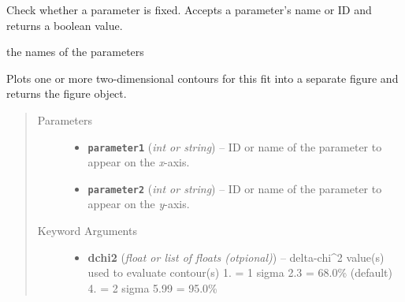 \documentclass[a4paper,10pt,english]{sphinxmanual}
\begin{document}
\begin{fulllineitems}
\begin{fulllineitems}
\end{fulllineitems}


\begin{fulllineitems}
\label{index:kafe.fit.Fit.parameter_is_fixed}
Check whether a parameter is fixed. Accepts a parameter's name or ID
and returns a boolean value.

\end{fulllineitems}


\begin{fulllineitems}
\label{index:kafe.fit.Fit.parameter_names}
the names of the parameters

\end{fulllineitems}


\begin{fulllineitems}
\label{index:kafe.fit.Fit.plot_contour}
Plots one or more two-dimensional contours for this fit into
a separate figure and returns the figure object.
\begin{quote}\begin{description}
\item[{Parameters}] \leavevmode\begin{itemize}
\item {} 
\textbf{\texttt{parameter1}} (\emph{int or string}) -- ID or name of the parameter to appear on the \emph{x}-axis.

\item {} 
\textbf{\texttt{parameter2}} (\emph{int or string}) -- ID or name of the parameter to appear on the \emph{y}-axis.

\end{itemize}

\item[{Keyword Arguments}] \leavevmode\begin{itemize}
\item {} 
\textbf{dchi2} (\emph{float or list of floats (otpional)}) --
delta-chi\textasciicircum{}2 value(s) used to evaluate contour(s)
1. = 1 sigma
2.3 = 68.0\% (default)
4.  = 2 sigma
5.99 = 95.0\%


\end{itemize}
\end{description}
\end{quote}
\end{fulllineitems}
\end{fulllineitems}
\end{document}
